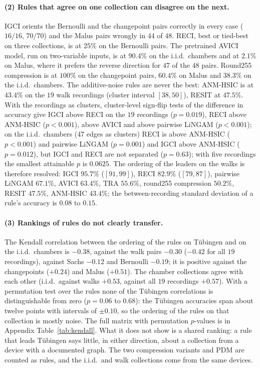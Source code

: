 \paragraph{(2) Rules that agree on one collection can disagree on the next.} IGCI orients the Bernoulli and the changepoint pairs correctly in every case ($16/16$, $70/70$) and the Malus pairs wrongly in $44$ of $48$. RECI, best or tied-best on three collections, is at $25\%$ on the Bernoulli pairs. The pretrained AVICI model, run on two-variable inputs, is at $90.4\%$ on the i.i.d.\ chambers and at $2.1\%$ on Malus, where it prefers the reverse direction for $47$ of the $48$ pairs. Round255 compression is at $100\%$ on the changepoint pairs, $60.4\%$ on Malus and $38.3\%$ on the i.i.d.\ chambers. The additive-noise rules are never the best: ANM-HSIC is at $43.4\%$ on the $19$ walk recordings (cluster interval $[38,50]$), RESIT at $47.5\%$. With the recordings as clusters, cluster-level sign-flip tests of the difference in accuracy give IGCI above RECI on the $19$ recordings ($p=0.019$), RECI above ANM-HSIC ($p<0.001$), above AVICI and above pairwise LiNGAM ($p<0.001$); on the i.i.d.\ chambers (47 edges as clusters) RECI is above ANM-HSIC ($p<0.001$) and pairwise LiNGAM ($p=0.001$) and IGCI above ANM-HSIC ($p=0.012$), but IGCI and RECI are not separated ($p=0.63$); with five recordings the smallest attainable $p$ is $0.0625$. The ordering of the leaders on the walks is therefore resolved: IGCI $95.7\%$ ($[91,99]$), RECI $82.9\%$ ($[79,87]$), pairwise LiNGAM $67.1\%$, AVICI $63.4\%$, TRA $55.6\%$, round255 compression $50.2\%$, RESIT $47.5\%$, ANM-HSIC $43.4\%$; the between-recording standard deviation of a rule's accuracy is $0.08$ to $0.15$.

\paragraph{(3) Rankings of rules do not clearly transfer.} The Kendall correlation between the ordering of the rules on T\"ubingen and on the i.i.d.\ chambers is $-0.38$, against the walk pairs $-0.30$ ($-0.42$ for all $19$ recordings), against Sachs $-0.12$ and Bernoulli $-0.19$; it is positive against the changepoints ($+0.24$) and Malus ($+0.51$). The chamber collections agree with each other (i.i.d.\ against walks $+0.53$, against all $19$ recordings $+0.57$). With a permutation test over the rules none of the T\"ubingen correlations is distinguishable from zero ($p=0.06$ to $0.68$): the T\"ubingen accuracies span about twelve points with intervals of $\pm0.10$, so the ordering of the rules on that collection is mostly noise. The full matrix with permutation $p$-values is in Appendix Table~\ref{tab:kendall}. What it does not show is a shared ranking: a rule that leads T\"ubingen says little, in either direction, about a collection from a device with a documented graph. The two compression variants and PDM are counted as rules, and the i.i.d.\ and walk collections come from the same devices.

